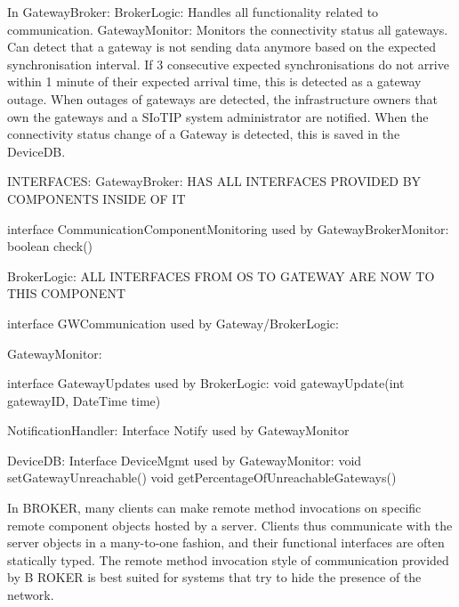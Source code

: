         In GatewayBroker:
            BrokerLogic: Handles all functionality related to communication.
            GatewayMonitor: Monitors the connectivity status all gateways. Can detect that a gateway is not sending data anymore based on the expected synchronisation interval. If 3 consecutive expected synchronisations do not arrive within 1 minute of their expected arrival time,
                            this is detected as a gateway outage. When outages of gateways are detected, the infrastructure owners that own the gateways and a SIoTIP system administrator are notified.
                            When the connectivity status change of a Gateway is detected, this is saved in the DeviceDB.

        INTERFACES:
            GatewayBroker:
                HAS ALL INTERFACES PROVIDED BY COMPONENTS INSIDE OF IT

                interface CommunicationComponentMonitoring used by GatewayBrokerMonitor:
                    boolean check()


            BrokerLogic:
                ALL INTERFACES FROM OS TO GATEWAY ARE NOW TO THIS COMPONENT

                interface GWCommunication used by Gateway/BrokerLogic:

            GatewayMonitor:

                interface GatewayUpdates used by BrokerLogic:
                    void gatewayUpdate(int gatewayID, DateTime time)

            NotificationHandler:
                Interface Notify used by GatewayMonitor

            DeviceDB:
                Interface DeviceMgmt used by GatewayMonitor:
                    void setGatewayUnreachable()
                    void getPercentageOfUnreachableGateways()


    In BROKER, many clients can make remote method invocations on
    specific remote component objects hosted by a server. Clients thus
    communicate with the server objects in a many-to-one fashion, and
    their functional interfaces are often statically typed. The remote
    method invocation style of communication provided by B ROKER is
    best suited for systems that try to hide the presence of the network.

